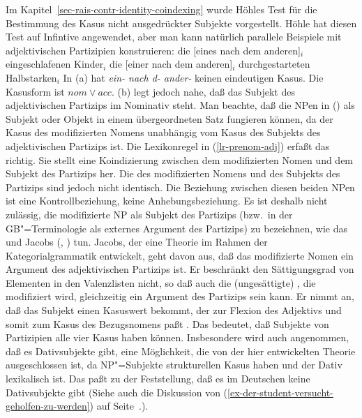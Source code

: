 {Im Kapitel~\ref{sec-rais-contr-identity-coindexing} wurde Höhles Test \citeyearpar[Kapitel~6]{Hoehle83a}
für die Bestimmung des Kasus nicht ausgedrückter Subjekte vorgestellt. Höhle hat diesen Test auf
Infintive angewendet, aber man kann natürlich parallele Beispiele mit adjektivischen Partizipien konstruieren:
\eal
\label{ex-subj-case-adjectival-part}
\ex
die [eines         nach  dem           anderen]$_i$ eingeschlafenen Kinder$_i$
\ex
die [einer         nach  dem           anderen]$_i$ durchgestarteten Halbstarken$_i$
\zl
In (a) hat {\em ein- nach d- ander-} keinen eindeutigen Kasus. Die
Kasusform ist $nom \vee acc$. (b) legt jedoch nahe, daß das Subjekt des adjektivischen
Partizips im Nominativ steht. Man beachte, daß die NPen in () als Subjekt oder Objekt in
einem übergeordneten Satz fungieren können, da der Kasus des modifizierten Nomens unabhängig vom
Kasus des Subjekts des adjektivischen Partizips ist. Die Lexikonregel in (\ref{lr-prenom-adj})
erfaßt das richtig. Sie stellt eine Koindizierung zwischen dem modifizierten Nomen und
dem Subjekt des Partizips her. Die \synsemwe des modifizierten Nomens und des Subjekts des Partizips
sind jedoch nicht identisch. Die Beziehung zwischen diesen beiden NPen ist eine Kontrollbeziehung,
keine Anhebungsbeziehung.
Es ist deshalb nicht zulässig, die modifizierte NP als Subjekt des Partizips (bzw.\ in der
GB"=Terminologie als externes Argument des Partizips) zu bezeichnen, wie das \zb
\citet[]{LR86a} und Jacobs
(\citeyear[]{Jacobs91a}, \citeyear[]{Jacobs92a-u}) tun. Jacobs, der eine Theorie im Rahmen der
Kategorialgrammatik entwickelt, geht davon aus, daß das modifizierte
Nomen ein Argument des adjektivischen Partizips ist. Er beschränkt den Sättigungsgrad von Elementen
in den Valenzlisten nicht, so daß auch die (ungesättigte) \nbar, die modifiziert wird, gleichzeitig
ein Argument des Partizips sein kann. Er nimmt an, daß das Subjekt einen Kasuswert bekommt, der zur 
Flexion des Adjektivs und somit zum Kasus des Bezugsnomens paßt \citep[]{Jacobs91a}. %
Das bedeutet, daß Subjekte von Partizipien alle vier Kasus haben können. Insbesondere wird auch angenommen, daß es
Dativsubjekte gibt, eine Möglichkeit, die von der hier entwickelten Theorie ausgeschlossen ist, da
NP"=Subjekte strukturellen Kasus haben und der Dativ lexikalisch ist. Das paßt zu der Feststellung,
daß es im Deutschen keine Dativsubjekte gibt (Siehe auch die Diskussion von
(\ref{ex-der-student-versucht-geholfen-zu-werden}) auf
Seite~\pageref{ex-der-student-versucht-geholfen-zu-werden}.).
%


}
